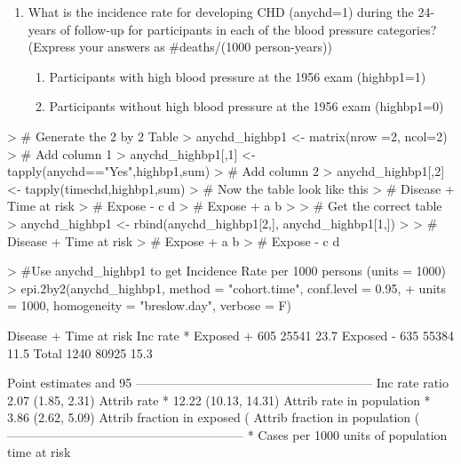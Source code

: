 \documentclass{article}
\begin{document}
\begin{enumerate}
  \item What is the incidence rate for developing CHD (anychd=1) during the 24-years of follow-up for participants in each of the blood pressure categories? (Express your answers as #deaths/(1000 person-years))
  \begin{enumerate}
  \item 
  Participants with high blood pressure at the 1956 exam (highbp1=1)
\item
Participants without high blood pressure at the 1956 exam (highbp1=0)
\end{enumerate}

\end{enumerate}

\begin{Schunk}
\begin{Sinput}
> # Generate the 2 by 2 Table
> anychd_highbp1 <- matrix(nrow =2, ncol=2)
> # Add column 1 
> anychd_highbp1[,1] <- tapply(anychd=="Yes",highbp1,sum)
> # Add column 2
> anychd_highbp1[,2] <- tapply(timechd,highbp1,sum)
> # Now the table look like this
> #    Disease +   Time at risk
> # Expose -   c   d
> # Expose +   a   b
> 
> # Get the correct table
> anychd_highbp1 <- rbind(anychd_highbp1[2,], anychd_highbp1[1,])
> 
> #    Disease +   Time at risk
> # Expose +   a   b
> # Expose -   c   d
\end{Sinput}
\end{Schunk}
\pagebreak
\begin{Schunk}
\begin{Sinput}
> #Use anychd_highbp1 to get Incidence Rate per 1000 persons (units = 1000)
> epi.2by2(anychd_highbp1, method = "cohort.time", conf.level = 0.95, 
+          units = 1000, homogeneity = "breslow.day", verbose = F)
\end{Sinput}
\begin{Soutput}
             Disease +    Time at risk        Inc rate *
Exposed +          605           25541              23.7
Exposed -          635           55384              11.5
Total             1240           80925              15.3

Point estimates and 95 % CIs:
---------------------------------------------------------
Inc rate ratio                           2.07 (1.85, 2.31)
Attrib rate *                            12.22 (10.13, 14.31)
Attrib rate in population *              3.86 (2.62, 5.09)
Attrib fraction in exposed (%)           51.6 (45.81, 56.77)
Attrib fraction in population (%)        25.17 (23.5, 26.81)
---------------------------------------------------------
 * Cases per 1000 units of population time at risk 
\end{Soutput}
\end{Schunk}
\end{document}
